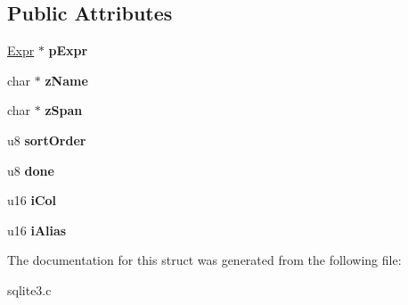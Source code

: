 \subsection*{Public Attributes}
\begin{DoxyCompactItemize}
\item 
\hypertarget{struct_expr_list_1_1_expr_list__item_a75906cf3ff19e5bf16373fec7f3c79ad}{\hyperlink{struct_expr}{Expr} $\ast$ {\bfseries p\-Expr}}\label{struct_expr_list_1_1_expr_list__item_a75906cf3ff19e5bf16373fec7f3c79ad}

\item 
\hypertarget{struct_expr_list_1_1_expr_list__item_af278eb03a1169c73d144547adaf9b04f}{char $\ast$ {\bfseries z\-Name}}\label{struct_expr_list_1_1_expr_list__item_af278eb03a1169c73d144547adaf9b04f}

\item 
\hypertarget{struct_expr_list_1_1_expr_list__item_ade485bb6fafb44ec2aba59d05b8d117b}{char $\ast$ {\bfseries z\-Span}}\label{struct_expr_list_1_1_expr_list__item_ade485bb6fafb44ec2aba59d05b8d117b}

\item 
\hypertarget{struct_expr_list_1_1_expr_list__item_af9084dc073f96792c0c7a8a894778881}{u8 {\bfseries sort\-Order}}\label{struct_expr_list_1_1_expr_list__item_af9084dc073f96792c0c7a8a894778881}

\item 
\hypertarget{struct_expr_list_1_1_expr_list__item_a84aad270c98e28a725a840aac3ee8576}{u8 {\bfseries done}}\label{struct_expr_list_1_1_expr_list__item_a84aad270c98e28a725a840aac3ee8576}

\item 
\hypertarget{struct_expr_list_1_1_expr_list__item_a72cf759413ceea37ddf2a4353cb666c2}{u16 {\bfseries i\-Col}}\label{struct_expr_list_1_1_expr_list__item_a72cf759413ceea37ddf2a4353cb666c2}

\item 
\hypertarget{struct_expr_list_1_1_expr_list__item_a06fc9fdfb94d35ec6ca742da23609239}{u16 {\bfseries i\-Alias}}\label{struct_expr_list_1_1_expr_list__item_a06fc9fdfb94d35ec6ca742da23609239}

\end{DoxyCompactItemize}


The documentation for this struct was generated from the following file\-:\begin{DoxyCompactItemize}
\item 
sqlite3.\-c\end{DoxyCompactItemize}
